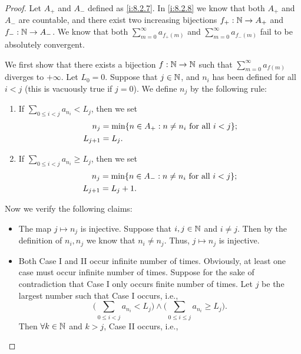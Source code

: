 \begin{proof}
  Let \(A_+\) and \(A_-\) defined as \cref{i:8.2.7}.
  In \cref{i:8.2.8} we know that both \(A_+\) and \(A_-\) are countable, and there exist two increasing bijections \(f_+ : \mathbb{N} \to A_+\) and \(f_- : \mathbb{N} \to A_-\).
  We know that both \(\sum_{m = 0}^\infty a_{f_+(m)}\) and \(\sum_{m = 0}^\infty a_{f_-(m)}\) fail to be absolutely convergent.

  We first show that there exists a bijection \(f : \mathbb{N} \to \mathbb{N}\) such that \(\sum_{m = 0}^\infty a_{f(m)}\) diverges to \(+\infty\).
  Let \(L_0 = 0\).
  Suppose that \(j \in \mathbb{N}\), and \(n_i\) has been defined for all \(i < j\)
  (this is vacuously true if \(j = 0\)).
  We define \(n_j\) by the following rule:
  \begin{enumerate}[label=(\Roman*)]
    \item If \(\sum_{0 \leq i < j} a_{n_i} < L_j\), then we set
          \begin{align*}
            n_j       & = \min\set{n \in A_+ : n \neq n_i \text{ for all } i < j}; \\
            L_{j + 1} & = L_j.
          \end{align*}
    \item If \(\sum_{0 \leq i < j} a_{n_i} \geq L_j\), then we set
          \begin{align*}
            n_j       & = \min\set{n \in A_- : n \neq n_i \text{ for all } i < j}; \\
            L_{j + 1} & = L_j + 1.
          \end{align*}
  \end{enumerate}
  Now we verify the following claims:
  \begin{itemize}
    \item The map \(j \mapsto n_j\) is injective.
          Suppose that \(i, j \in \mathbb{N}\) and \(i \neq j\).
          Then by the definition of \(n_i, n_j\) we know that \(n_i \neq n_j\).
          Thus, \(j \mapsto n_j\) is injective.
    \item Both Case I and II occur infinite number of times.
          Obviously, at least one case must occur infinite number of times.
          Suppose for the sake of contradiction that Case I only occurs finite number of times.
          Let \(j\) be the largest number such that Case I occurs, i.e.,
          \[
            \Bigg(\sum_{0 \leq i < j} a_{n_i} < L_j\Bigg) \land \Bigg(\sum_{0 \leq i \leq j} a_{n_i} \geq L_j\Bigg).
          \]
          Then \(\forall k \in \mathbb{N}\) and \(k > j\), Case II occurs, i.e.,

\end{itemize}
\end{proof}

